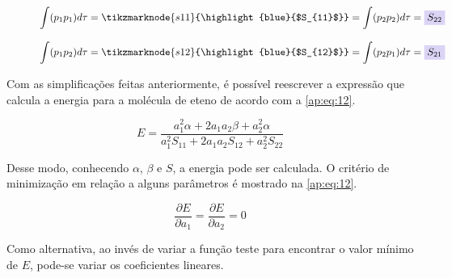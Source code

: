 \begin{figure}[htb]
    \vspace{2\baselineskip}
\begin{equation}
\label{ap:eq:10}
    \displaystyle \int (p_1 p_1) d\tau = \tikzmarknode{s11}{\highlight{blue}{$S_{11}$}} = \displaystyle \int (p_2 p_2) d\tau = \highlight{blue}{$S_{22}$}
\end{equation}
\end{figure}

\begin{figure}[htb]
    \vspace{2\baselineskip}
\begin{equation}
\label{ap:eq:11}
    \displaystyle \int (p_1 p_2) d\tau = \tikzmarknode{s12}{\highlight{blue}{$S_{12}$}} = \displaystyle \int (p_2 p_1) d\tau = \highlight{blue}{$S_{21}$}
\end{equation}
\end{figure}

Com as simplificações feitas anteriormente, é possível reescrever a expressão que calcula a energia para a molécula de eteno de acordo com a \autoref{ap:eq:12}.

\begin{figure}[htb]
    \vspace{2\baselineskip}
\begin{equation}
\label{ap:eq:12}
    E = \frac{a_1^2 \alpha + 2a_1 a_2 \beta + a_2^2 \alpha}{a_1^2 S_{11} + 2a_1 a_2 S_{12} + a_2^2 S_{22}}
\end{equation}
\end{figure}

Desse modo, conhecendo $\alpha$, $\beta$ e $S$, a energia pode ser calculada. O critério de minimização em relação a alguns parâmetros é mostrado na \autoref{ap:eq:12}.

\begin{figure}[htb]
    \vspace{2\baselineskip}
\begin{equation}
\label{ap:eq:12}
    \frac{\partial E}{\partial a_1} = \frac{\partial E}{\partial a_2} = 0
\end{equation}
\end{figure}

Como alternativa, ao invés de variar a função teste para encontrar o valor mínimo de $E$, pode-se variar os coeficientes lineares.